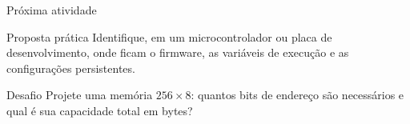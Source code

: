 \begin{frame}[t]{Próxima atividade}
  \begin{block}{Proposta prática}
    Identifique, em um microcontrolador ou placa de desenvolvimento, onde ficam o firmware, as variáveis de execução e as configurações persistentes.
  \end{block}
  \begin{exampleblock}{Desafio}
    Projete uma memória $256 \times 8$: quantos bits de endereço são necessários e qual é sua capacidade total em bytes?
  \end{exampleblock}
\end{frame}
